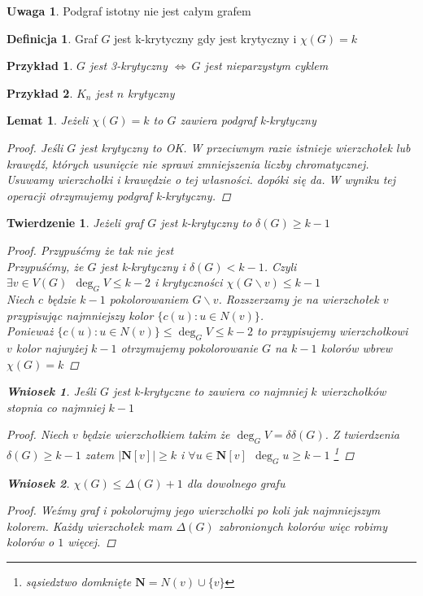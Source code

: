 \documentclass[12pt,a4paper]{article}
\newtheorem{lemat}{Lemat}
\newtheorem{tw}{Twierdzenie}
\newtheorem{przyklad}{Przykład}
\theoremstyle{definition}
\newtheorem{df}{Definicja}
\newtheorem{wniosek}{Wniosek}
\newtheorem{uwaga}{Uwaga}
\begin{document}
\begin{uwaga}
Podgraf istotny nie jest całym grafem
\end{uwaga}

\begin{df}
Graf $G$ jest  k-krytyczny gdy jest krytyczny i $\chi(G) = k$

\begin{przyklad}
$G$ jest 3-krytyczny $\Leftrightarrow ~G$ jest nieparzystym cyklem 
\end{przyklad}
\begin{przyklad}
$K_n$ jest $n$ krytyczny
\end{przyklad}

\begin{lemat}
Jeżeli $\chi(G)=k$ to $G$ zawiera podgraf k-krytyczny
\begin{proof}
Jeśli $G$ jest krytyczny to OK. W przeciwnym razie istnieje wierzchołek lub krawędź, których usunięcie nie sprawi zmniejszenia liczby chromatycznej. Usuwamy wierzchołki i krawędzie o tej własności. dopóki się da. W wyniku tej operacji otrzymujemy podgraf k-krytyczny.
\end{proof}
\end{lemat}
\end{df}

\begin{tw}
Jeżeli graf $G$ jest k-krytyczny to $\delta(G) \geqslant k-1$
\begin{proof}
Przypuśćmy że tak nie jest\\
Przypuśćmy, że $G$ jest k-krytyczny i $\delta (G) < k-1$. Czyli $\exists v\in V(G) ~~ \deg_GV \leqslant k-2$ i krytyczności $\chi(G\smallsetminus v)\leqslant k-1$\\
Niech $c$ będzie $k-1$ pokolorowaniem $G\smallsetminus v$. Rozszerzamy je na wierzchołek $v$ przypisując najmniejszy kolor $\{c(u) : u\in N(v) \}$.\\
Ponieważ $\{c(u) : u\in N(v) \} \leqslant \deg_GV \leqslant k-2$ to przypisujemy wierzchołkowi $v$ kolor najwyżej $k-1$ otrzymujemy pokolorowanie $G$ na $k-1$ kolorów wbrew $\chi(G)=k$
\end{proof}

\begin{wniosek}
Jeśli $G$ jest k-krytyczne to zawiera co najmniej $k$ wierzchołków stopnia co najmniej $k-1$
\end{wniosek}
\begin{proof}
Niech $v$ będzie wierzchołkiem takim że $\deg_GV = \delta \delta(G)$. Z twierdzenia $\delta(G) \geqslant k-1$ zatem $|\mathbf{N}[v]| \geqslant k$ i $\forall u\in\mathbf{N}[v] ~~ \deg_Gu\geqslant k-1$ \footnote{sąsiedztwo domknięte $\mathbf{N} = N(v) \cup \{v\}$ }
\end{proof}

\begin{wniosek}
$\chi(G) \leqslant \Delta(G)+1$ dla dowolnego grafu
\begin{proof}
Weźmy graf i pokolorujmy jego wierzchołki po koli jak najmniejszym kolorem. Każdy wierzchołek mam $\Delta(G)$ zabronionych kolorów więc robimy kolorów o $1$ więcej.
\end{proof}
\end{wniosek}
\end{tw}
\end{document}
